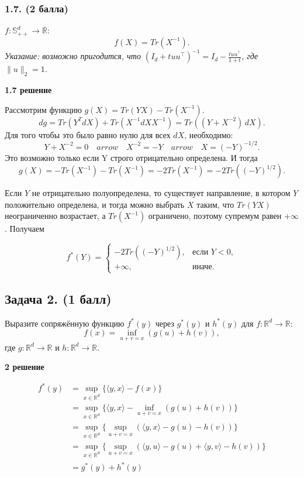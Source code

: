 \documentclass[12pt]{article}
\begin{document}
\subsubsection*{1.7. (2 балла)}
$ f : \mathbb{S}_{++}^d \to \mathbb{R} $: 
$$
f(X) = Tr(X^{-1}).
$$
\textit{Указание: возможно пригодится, что $ (I_d + tuu^\top)^{-1} = I_d - \frac{tuu^\top}{1+t} $, где $ \|u\|_2 = 1 $.}

\textbf{1.7 решение}

Рассмотрим функцию $g(X) = Tr(Y X) - Tr(X^{-1})$.
$$
d g = Tr(Y^TdX) + Tr(X^{-1}dX X^{-1}) = Tr( (Y + X^{-2}) \, dX ).
$$
Для того чтобы это было равно нулю для всех $dX$, необходимо:
$$
Y + X^{-2} = 0 \quad  arrow \quad X^{-2} = -Y \quad  arrow \quad X = (-Y)^{-1/2}.
$$
Это возможно только если Y строго отрицательно определена. И тогда
$$
g(X) = -Tr(X^{-1}) - Tr(X^{-1}) = -2 Tr(X^{-1}) = -2 Tr((-Y)^{1/2}).
$$

Если $Y$ не отрицательно полуопределена, то существует направление, в котором $Y$ положительно определена, и тогда можно выбрать $X$ таким, что $Tr(Y X)$ неограниченно возрастает, а $Tr(X^{-1})$ ограничено, поэтому супремум равен $+\infty$.
Получаем 

$$
f^*(Y) = 
\begin{cases} 
-2 Tr ( (-Y)^{1/2}  ), & \text{если } Y < 0, \\
+\infty, & \text{иначе}.
\end{cases}
$$

\subsection*{Задача 2. (1 балл)}
Выразите сопряжённую функцию $ f^*(y) $ через $ g^*(y) $ и $ h^*(y) $ для $ f : \mathbb{R}^d \to \mathbb{R} $: 
$$
f(x) = \inf_{u+v=x} (g(u) + h(v)),
$$
где $ g : \mathbb{R}^d \to \mathbb{R} $ и $ h : \mathbb{R}^d \to \mathbb{R} $.

\textbf{2 решение}

$$
\begin{aligned}
    f^*(y)
    &= \sup_{x \in \mathbb{R}^d} \{ \langle y, x \rangle - f(x) \} \\
    &= \sup_{x \in \mathbb{R}^d} \{ \langle y, x \rangle - \inf_{u+v=x} (g(u) + h(v)) \} \\
    &= \sup_{x \in \mathbb{R}^d} \{  \sup_{u+v=x} (\langle y, x \rangle - g(u) - h(v)) \} \\
    &= \sup_{x \in \mathbb{R}^d} \{  \sup_{u+v=x} (\langle y, u \rangle - g(u) + \langle y, v \rangle- h(v)) \} \\
    &= g^*(y) + h^*(y)
\end{aligned}
$$
\end{document}
